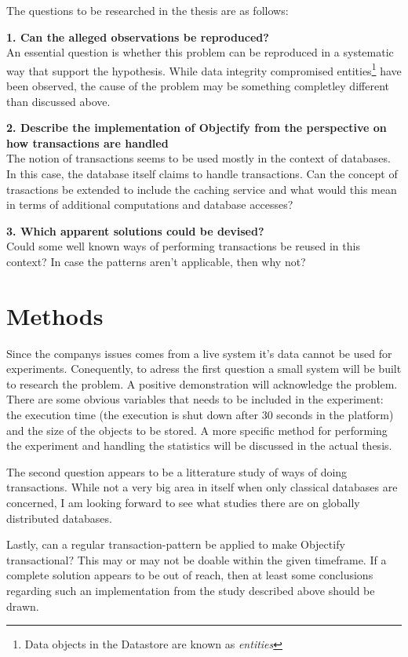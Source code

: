 \documentclass[10pt, titlepage, oneside, a4paper]{article}
\begin{document}
The questions to be researched in the thesis are as follows:

\textbf{1. Can the alleged observations be reproduced?}\\
An essential question is whether this problem can be reproduced in a
systematic way that support the hypothesis. While data integrity
compromised entities\footnote{Data objects in the Datastore are known
  as \emph{entities}} have been observed, the cause of the problem may
be something completley different than discussed above.

\textbf{2. Describe the implementation of Objectify from the
  perspective on how transactions are handled}\\ The notion of transactions seems to be used mostly in the context of
databases. In this case, the database itself claims to handle
transactions. Can the concept of trasactions be extended to include
the caching service and what would this mean in terms of additional
computations and database accesses?

\textbf{3. Which apparent solutions could be devised?}\\
Could some well known ways of performing transactions be reused in
this context? In case the patterns aren't applicable, then why not?


\section*{Methods}

Since the companys issues comes from a live system it’s data cannot
be used for experiments. Conequently, to adress the first question a
small system will be built to research the problem. A positive
demonstration will acknowledge the problem. There are some obvious
variables that needs to be included in the experiment: the execution time (the execution
is shut down after 30 seconds in the platform) and the size of the
objects to be stored. A more specific method for performing the experiment
and handling the statistics will be discussed in the actual thesis.

The second question appears to be a litterature study of ways of doing
transactions. While not a very big area in itself when only classical
databases are concerned, I am looking forward to see what studies
there are on globally distributed databases.

Lastly, can a regular transaction-pattern be applied to make Objectify
transactional? This may or may not be doable within the given
timeframe. If a complete solution appears to be out of reach, then at
least some conclusions regarding such an implementation from the study
described above should be drawn. 
\end{document}
